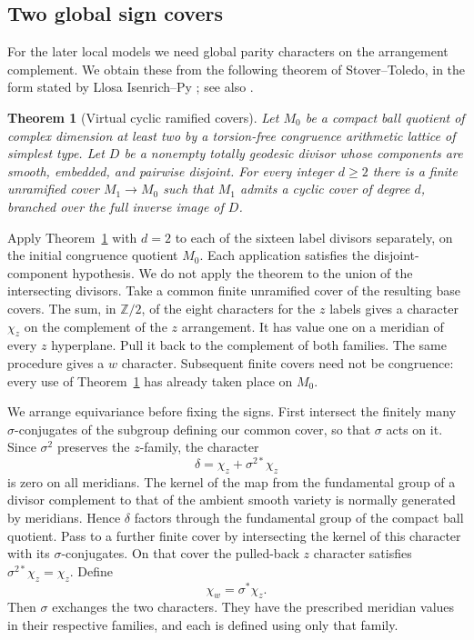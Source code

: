 \documentclass[11pt,reqno]{amsart}
\numberwithin{equation}{section}
\newtheorem{theorem}{Theorem}[section]
\theoremstyle{definition}
\theoremstyle{remark}
\begin{document}
\subsection{Two global sign covers}\label{geo:signs}

For the later local models we need global parity characters on the
arrangement complement.  We obtain these from the following theorem
of Stover--Toledo, in the form stated by Llosa Isenrich--Py
\cite[Theorem~4.2]{LlosaPy}; see also \cite{StoverToledo}.

\begin{theorem}[Virtual cyclic ramified covers]\label{geo:stover-toledo}
Let $M_0$ be a compact ball quotient of complex dimension at least two
by a torsion-free congruence arithmetic lattice of simplest type.  Let
$D$ be a nonempty totally geodesic divisor whose components are smooth,
embedded, and pairwise disjoint.  For every integer $d\ge2$ there is a
finite unramified cover $M_1\to M_0$ such that $M_1$ admits a cyclic
cover of degree $d$, branched over the full inverse image of $D$.
\end{theorem}

Apply Theorem~\ref{geo:stover-toledo} with $d=2$ to each of the sixteen
label divisors separately, on the initial congruence quotient $M_0$.
Each application satisfies the disjoint-component hypothesis.  We do
not apply the theorem to the union of the intersecting divisors.  Take
a common finite unramified cover of the resulting base covers.  The
sum, in $\mathbb Z/2$, of the eight characters for the $z$ labels gives a
character $\chi_z$ on the complement of the $z$ arrangement.  It has
value one on a meridian of every $z$ hyperplane.  Pull it back to the
complement of both families.  The same procedure gives a $w$ character.
Subsequent finite covers need not be congruence: every use of
Theorem~\ref{geo:stover-toledo} has already taken place on $M_0$.

We arrange equivariance before fixing the signs.  First intersect the
finitely many $\sigma$-conjugates of the subgroup defining our common
cover, so that $\sigma$ acts on it.  Since $\sigma^2$ preserves the
$z$-family, the character
\[
                 \delta=\chi_z+\sigma^{2*}\chi_z
\]
is zero on all meridians.  The kernel of the map from the fundamental
group of a divisor complement to that of the ambient smooth variety
is normally generated by meridians.  Hence $\delta$ factors through
the fundamental group of the compact ball quotient.  Pass to a further
finite cover by intersecting the kernel of this character with its
$\sigma$-conjugates.  On that cover the pulled-back $z$ character
satisfies $\sigma^{2*}\chi_z=\chi_z$.  Define
\begin{equation}\label{geo:sign-equivariance}
                  \chi_w=\sigma^*\chi_z.
\end{equation}
Then $\sigma$ exchanges the two characters.  They have the prescribed
meridian values in their respective families, and each is defined
using only that family.
\end{document}
